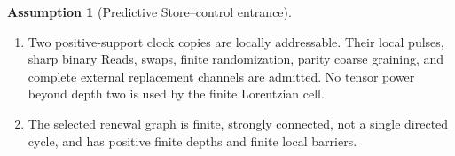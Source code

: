 \documentclass[11pt]{article}
\theoremstyle{definition}
\newtheorem{assumption}[theorem]{Assumption}
\theoremstyle{remark}
\begin{document}
\begin{assumption}[Predictive Store--control entrance]
\begin{enumerate}[label=\textup{(S\arabic*)},leftmargin=3em]
      operations, one physical real pointer--score pulse, resolved score-sign
      outcomes, fresh locally addressable copies, and a controlled score
      instrument.  Its one- and two-depth successes, the finite mixed
      Store--score histories used below, and absolute loading are retained
      whenever Newton, vacuum, or common-action coefficients are claimed.
      The canonical writer, lossless router, and the relative phases needed for
      ordered-history tomography are then derived by
      ;
      they are not separate pair-specific assumptions.  Whenever powers of one
      positive score transfer are used, the measured instrument must pass the
      persistent-transfer certificate of
      .
\item Two positive-support clock copies are locally addressable.  Their local
      pulses, sharp binary Reads, swaps, finite randomization, parity coarse
      graining, and complete external replacement channels are admitted.  No
      tensor power beyond depth two is used by the finite Lorentzian cell.
\item The selected renewal graph is finite, strongly connected, not a single
      directed cycle, and has positive finite depths and finite local barriers.
\end{enumerate}
\end{assumption}
\end{document}
